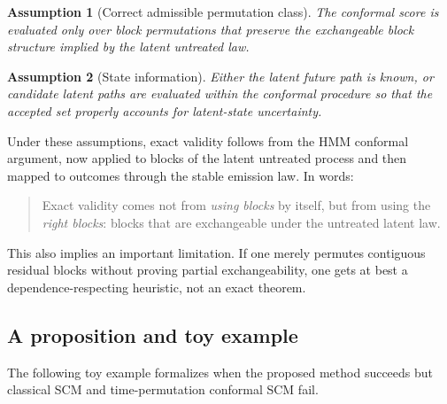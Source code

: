 \documentclass[11pt]{article}
\newtheorem{assumption}{Assumption}
\begin{document}
\begin{assumption}[Correct admissible permutation class]
The conformal score is evaluated only over block permutations that preserve the exchangeable block structure implied by the latent untreated law.
\end{assumption}

\begin{assumption}[State information]
Either the latent future path is known, or candidate latent paths are evaluated within the conformal procedure so that the accepted set properly accounts for latent-state uncertainty.
\end{assumption}

Under these assumptions, exact validity follows from the HMM conformal argument, now applied to blocks of the latent untreated process and then mapped to outcomes through the stable emission law. In words:

\begin{quote}
Exact validity comes not from \emph{using blocks} by itself, but from using the \emph{right blocks}: blocks that are exchangeable under the untreated latent law.
\end{quote}

This also implies an important limitation. If one merely permutes contiguous residual blocks without proving partial exchangeability, one gets at best a dependence-respecting heuristic, not an exact theorem.

\subsection{A proposition and toy example}

The following toy example formalizes when the proposed method succeeds but classical SCM and time-permutation conformal SCM fail.
\end{document}
